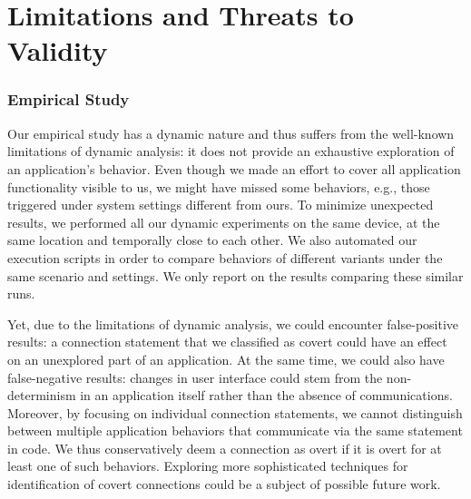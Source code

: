\section{Limitations and Threats to \\Validity}
\label{sec:limitations}

\subsubsection{Empirical Study}
Our empirical study has a dynamic nature and thus suffers from the well-known limitations of dynamic analysis: it does not provide an exhaustive exploration of an application's behavior.
Even though we made an effort to cover all application functionality visible to us, we might have missed some behaviors, e.g., those triggered under system settings different from ours. 
To minimize unexpected results, we performed all our dynamic experiments on the same device, at the same location and temporally close to each other.  
We also automated our execution scripts in order to compare behaviors of different variants under the same scenario and settings. 
We only report on the results comparing these similar runs.  

Yet, due to the limitations of dynamic analysis, we could encounter false-positive results: a connection statement that we classified as covert could have an effect on an unexplored part of an application. 
At the same time, we could also have false-negative results: changes in user interface could stem from the non-determinism in an application itself rather than the absence of communications. 
Moreover, by focusing on individual connection statements, we cannot distinguish between multiple application behaviors
that communicate via the same statement in code. We thus conservatively deem a connection as overt if it is overt for at least one of such behaviors. 
Exploring more sophisticated techniques for identification of covert connections could be a subject of possible future work.


